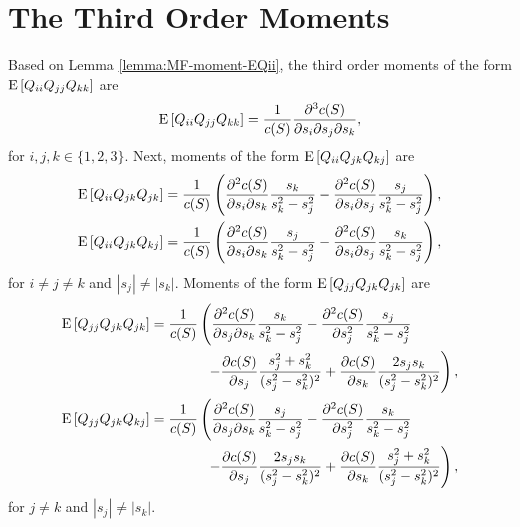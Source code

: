 \section{The Third Order Moments}

Based on Lemma \ref{lemma:MF-moment-EQii}, the third order moments of the form
$\mathrm{E}\left[ Q_{ii}Q_{jj}Q_{kk} \right]$ are
\begin{align}
	\mathrm{E}\left[ Q_{ii}Q_{jj}Q_{kk} \right] = \frac{1}{c(S)} \frac{\partial^3 c(S)}{\partial s_i \partial s_j \partial s_k},
\end{align}
for $i,j,k\in\{1,2,3\}$.
Next, moments of the form $\mathrm{E}\left[ Q_{ii}Q_{jk}Q_{kj} \right]$ are
\begin{subequations}
	\begin{align}
		\mathrm{E}\left[ Q_{ii}Q_{jk}Q_{jk} \right] &= \frac{1}{c(S)} \left( \frac{\partial^2 c(S)}{\partial s_i \partial s_k} \frac{s_k}{s_k^2-s_j^2} - \frac{\partial^2 c(S)}{\partial s_i \partial s_j} \frac{s_j}{s_k^2-s_j^2} \right), \\
		\mathrm{E}\left[ Q_{ii}Q_{jk}Q_{kj} \right] &= \frac{1}{c(S)} \left( \frac{\partial^2 c(S)}{\partial s_i \partial s_k} \frac{s_j}{s_k^2-s_j^2} - \frac{\partial^2 c(S)}{\partial s_i \partial s_j} \frac{s_k}{s_k^2-s_j^2} \right),
	\end{align}
\end{subequations}
for $i\neq j\neq k$ and $|s_j|\neq |s_k|$.
Moments of the form $\mathrm{E}\left[ Q_{jj}Q_{jk}Q_{jk} \right]$ are
\begin{subequations}
	\begin{align}
		\mathrm{E}\left[ Q_{jj}Q_{jk}Q_{jk} \right] &= \frac{1}{c(S)} \left( \frac{\partial^2 c(S)}{\partial s_j \partial s_k} \frac{s_k}{s_k^2-s_j^2} - \frac{\partial^2 c(S)}{\partial s_j^2} \frac{s_j}{s_k^2-s_j^2} \right. \nonumber \\
		&\qquad\qquad \left. - \frac{\partial c(S)}{\partial s_j} \frac{s_j^2+s_k^2}{(s_j^2-s_k^2)^2} + \frac{\partial c(S)}{\partial s_k} \frac{2s_js_k}{(s_j^2-s_k^2)^2} \right), \\
		\mathrm{E}\left[ Q_{jj}Q_{jk}Q_{kj} \right] &= \frac{1}{c(S)} \left( \frac{\partial^2 c(S)}{\partial s_j \partial s_k} \frac{s_j}{s_k^2-s_j^2} - \frac{\partial^2 c(S)}{\partial s_j^2} \frac{s_k}{s_k^2-s_j^2} \right. \nonumber \\
		&\qquad\qquad \left. - \frac{\partial c(S)}{\partial s_j} \frac{2s_js_k}{(s_j^2-s_k^2)^2} + \frac{\partial c(S)}{\partial s_k} \frac{s_j^2+s_k^2}{(s_j^2-s_k^2)^2} \right),
	\end{align}
\end{subequations}
for $j\neq k$ and $|s_j|\neq |s_k|$.
